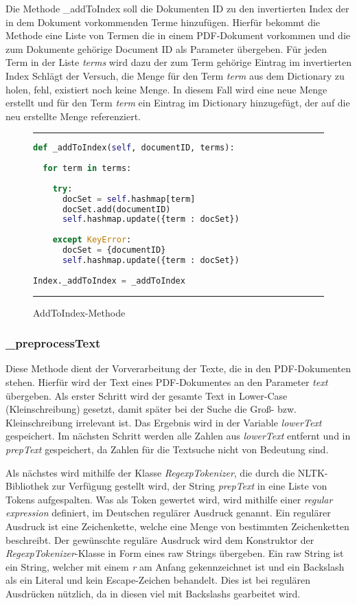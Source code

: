 Die Methode \_addToIndex soll die Dokumenten ID zu den invertierten Index der in dem Dokument vorkommenden Terme hinzufügen. Hierfür bekommt die Methode eine Liste von Termen die in einem PDF-Dokument vorkommen und die zum Dokumente gehörige Document ID als Parameter übergeben. Für jeden Term in der Liste \emph{terms} wird dazu der zum Term gehörige Eintrag im invertierten Index 
Schlägt der Versuch, die Menge für den Term \emph{term} aus dem Dictionary zu holen, fehl, existiert noch keine Menge. In diesem Fall wird eine neue Menge erstellt und für den Term \emph{term} ein Eintrag im Dictionary hinzugefügt, der auf die neu erstellte Menge referenziert.

\begin{figure}[h]
	\rule{\textwidth}{0.4pt}
		\begin{lstlisting}[language=Python]
def _addToIndex(self, documentID, terms):
    
  for term in terms:
        
    try:
      docSet = self.hashmap[term]
      docSet.add(documentID)
      self.hashmap.update({term : docSet})
            
    except KeyError:
      docSet = {documentID}
      self.hashmap.update({term : docSet})
    
Index._addToIndex = _addToIndex
		\end{lstlisting}
	\rule{\textwidth}{0.4pt}
	\caption{AddToIndex-Methode}
	\label{fig:addToIndex}
\end{figure}

\subsubsection{\_preprocessText}\label{preprocess}
Diese Methode dient der Vorverarbeitung der Texte, die in den PDF-Dokumenten stehen. Hierfür wird der Text eines PDF-Dokumentes an den Parameter \textit{text} übergeben. Als erster Schritt wird der gesamte Text in Lower-Case (Kleinschreibung) gesetzt, damit später bei der Suche die Groß- bzw. Kleinschreibung irrelevant ist. Das Ergebnis wird in der Variable \textit{lowerText} gespeichert. Im nächsten Schritt werden alle Zahlen aus \textit{lowerText} entfernt und in \textit{prepText} gespeichert, da Zahlen für die Textsuche nicht von Bedeutung sind.

Als nächstes wird mithilfe der Klasse \textit{RegexpTokenizer}, die durch die NLTK-Bibliothek zur Verfügung gestellt wird, der String \textit{prepText} in eine Liste von Tokens aufgespalten. Was als Token gewertet wird, wird mithilfe einer \textit{regular expression} definiert, im Deutschen regulärer Ausdruck genannt. Ein regulärer Ausdruck ist eine Zeichenkette, welche eine Menge von bestimmten Zeichenketten beschreibt. Der gewünschte reguläre Ausdruck wird dem Konstruktor der \textit{RegexpTokenizer}-Klasse in Form eines raw Strings übergeben. Ein raw String ist ein String, welcher mit einem \textit{r} am Anfang gekennzeichnet ist und ein Backslash als ein Literal und kein Escape-Zeichen behandelt. Dies ist bei regulären Ausdrücken nützlich, da in diesen viel mit Backslashs gearbeitet wird.

